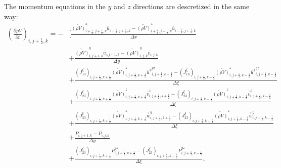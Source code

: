 The momentum equations in the $y$ and $z$ directions are descretized 
in the same way:
\begin{align}
 \left(\frac{\partial \rho V}{\partial t}\right)_{i,j+\frac{1}{2},k}
 = - &\Bigg[ \frac{ \widetilde{(\rho V)}^x_{i+\frac{1}{2},j+\frac{1}{2},k} \overline{u}_{i-\frac{1}{2},j+\frac{1}{2},k}
                  - \widetilde{(\rho V)}^x_{i+\frac{1}{2},j+\frac{1}{2},k} \overline{u}_{i-\frac{1}{2},j+\frac{1}{2},k}
                  } {\Delta x} \nonumber \\
          &+ \frac{ \widetilde{(\rho V)}^y_{i,j+1,k} \overline{v}_{i,j+1,k}
                  - \widetilde{(\rho V)}^y_{i,j  ,k} \overline{v}_{i,j  ,k}
                  } {\Delta y} \nonumber \\
          &+ \frac{ (J^{\xi}_{13})_{i,j+\frac{1}{2},k+\frac{1}{2}} \widetilde{(\rho V)}^z_{i,j+\frac{1}{2},k+\frac{1}{2}} \overline{\overline{u}^x}^{yz}_{i,j+\frac{1}{2},k+\frac{1}{2}}
                  - (J^{\xi}_{13})_{i,j+\frac{1}{2},k-\frac{1}{2}} \widetilde{(\rho V)}^z_{i,j+\frac{1}{2},k-\frac{1}{2}} \overline{\overline{u}^x}^{yz}_{i,j+\frac{1}{2},k-\frac{1}{2}}
                  } {\Delta \xi} \nonumber \\
          &+ \frac{ (J^{\xi}_{23})_{i,j+\frac{1}{2},k+\frac{1}{2}} \widetilde{(\rho V)}^z_{i,j+\frac{1}{2},k+\frac{1}{2}} \overline{\overline{v}}^z_{i,j+\frac{1}{2},k+\frac{1}{2}}
                  - (J^{\xi}_{23})_{i,j+\frac{1}{2},k-\frac{1}{2}} \widetilde{(\rho V)}^z_{i,j+\frac{1}{2},k-\frac{1}{2}} \overline{\overline{v}}^z_{i,j+\frac{1}{2},k-\frac{1}{2}}
                  } {\Delta \xi} \nonumber \\
          &+ \frac{ (J^{\xi}_{33})_{i,j+\frac{1}{2},k+\frac{1}{2}} \widetilde{(\rho V)}^z_{i,j+\frac{1}{2},k+\frac{1}{2}} \overline{\overline{w}}^y_{i,j+\frac{1}{2},k+\frac{1}{2}}
                  - (J^{\xi}_{33})_{i,j+\frac{1}{2},k-\frac{1}{2}} \widetilde{(\rho V)}^z_{i,j+\frac{1}{2},k-\frac{1}{2}} \overline{\overline{w}}^y_{i,j+\frac{1}{2},k-\frac{1}{2}}
                  } {\Delta \xi} \nonumber \\
          &+ \frac{ P_{i,j+1,k}-P_{i,j,k}}{\Delta y} \nonumber \\
          &+ \frac{ (J^{\xi}_{23})_{i,j+\frac{1}{2},k+\frac{1}{2}} \overline{P}^{yz}_{i,j+\frac{1}{2},k+\frac{1}{2}}
                  - (J^{\xi}_{23})_{i,j+\frac{1}{2},k-\frac{1}{2}} \overline{P}^{yz}_{i,j+\frac{1}{2},k-\frac{1}{2}}
                  } {\Delta \xi},
\end{align}

